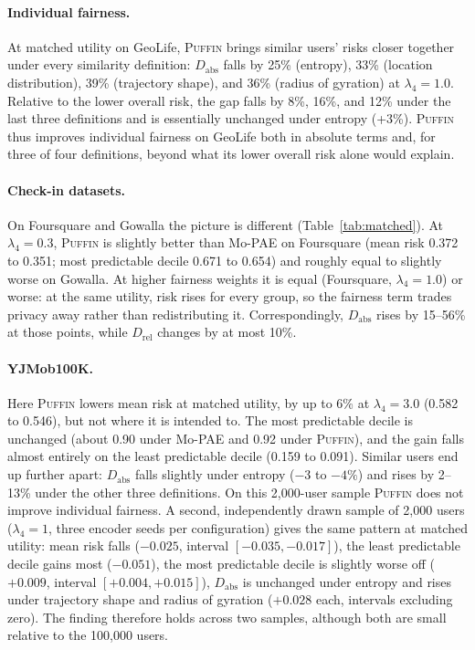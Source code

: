 \documentclass[sigconf,anonymous,review]{acmart}
\newcommand{\puffin}{\textsc{Puffin}}
\begin{document}
\paragraph{Individual fairness.} At matched utility on GeoLife, \puffin{} brings similar users' risks closer together under every similarity definition: $D_{\mathrm{abs}}$ falls by 25\% (entropy), 33\% (location distribution), 39\% (trajectory shape), and 36\% (radius of gyration) at $\lambda_4=1.0$. Relative to the lower overall risk, the gap falls by 8\%, 16\%, and 12\% under the last three definitions and is essentially unchanged under entropy (+3\%). \puffin{} thus improves individual fairness on GeoLife both in absolute terms and, for three of four definitions, beyond what its lower overall risk alone would explain.

\paragraph{Check-in datasets.} On Foursquare and Gowalla the picture is different (Table~\ref{tab:matched}). At $\lambda_4=0.3$, \puffin{} is slightly better than Mo-PAE on Foursquare (mean risk 0.372 to 0.351; most predictable decile 0.671 to 0.654) and roughly equal to slightly worse on Gowalla. At higher fairness weights it is equal (Foursquare, $\lambda_4=1.0$) or worse: at the same utility, risk rises for every group, so the fairness term trades privacy away rather than redistributing it. Correspondingly, $D_{\mathrm{abs}}$ rises by 15--56\% at those points, while $D_{\mathrm{rel}}$ changes by at most 10\%.

\paragraph{YJMob100K\@.} Here \puffin{} lowers mean risk at matched utility, by up to 6\% at $\lambda_4=3.0$ (0.582 to 0.546), but not where it is intended to. The most predictable decile is unchanged (about 0.90 under Mo-PAE and 0.92 under \puffin), and the gain falls almost entirely on the least predictable decile (0.159 to 0.091). Similar users end up further apart: $D_{\mathrm{abs}}$ falls slightly under entropy ($-3$ to $-4\%$) and rises by 2--13\% under the other three definitions. On this 2{,}000-user sample \puffin{} does not improve individual fairness. A second, independently drawn sample of 2{,}000 users ($\lambda_4=1$, three encoder seeds per configuration) gives the same pattern at matched utility: mean risk falls ($-0.025$, interval $[-0.035,-0.017]$), the least predictable decile gains most ($-0.051$), the most predictable decile is slightly worse off ($+0.009$, interval $[+0.004,+0.015]$), $D_{\mathrm{abs}}$ is unchanged under entropy and rises under trajectory shape and radius of gyration ($+0.028$ each, intervals excluding zero). The finding therefore holds across two samples, although both are small relative to the 100{,}000 users.
\end{document}
